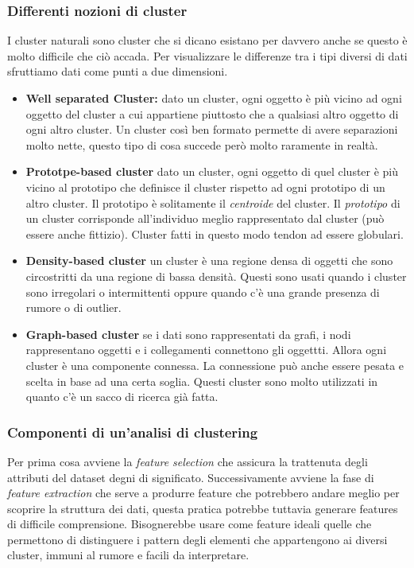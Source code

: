 \subsubsection{Differenti nozioni di cluster}
I cluster naturali sono cluster che si dicano esistano per davvero anche se questo  è molto difficile che ciò accada. Per visualizzare le differenze tra i tipi diversi di dati sfruttiamo dati come punti a due dimensioni.
\begin{itemize}
	\item \textbf{Well separated Cluster:} dato un cluster, ogni oggetto è più vicino ad ogni oggetto del cluster a cui appartiene piuttosto che a qualsiasi altro oggetto di ogni altro cluster. Un cluster così ben formato permette di avere separazioni molto nette, questo tipo di cosa succede però molto raramente in realtà.
	\item \textbf{Prototpe-based cluster} dato un cluster, ogni oggetto di quel cluster è più vicino al prototipo che definisce il cluster rispetto ad ogni prototipo di un altro cluster. Il prototipo \`e solitamente il \textit{centroide} del cluster. Il \textit{prototipo} di un cluster corrisponde all'individuo meglio rappresentato dal cluster (può essere anche fittizio). Cluster fatti in questo modo tendon ad essere globulari.
	\item \textbf{Density-based cluster} un cluster è una regione densa di oggetti che sono circostritti da una regione di bassa densità. Questi sono usati quando i cluster sono irregolari o intermittenti oppure quando c'è una grande presenza di rumore o di outlier.
	\item \textbf{Graph-based cluster} se i dati sono rappresentati da grafi, i nodi rappresentano  oggetti e i collegamenti connettono gli oggettti. Allora ogni cluster è una componente connessa. La connessione può anche essere pesata e scelta in base ad una certa soglia. 
	Questi cluster sono molto utilizzati in quanto c'è un sacco di ricerca già fatta.
\end{itemize}

\subsubsection{Componenti di un'analisi di clustering}

Per prima cosa  avviene la \textit{feature selection} che assicura la trattenuta degli attributi del dataset degni di significato. Successivamente avviene la fase di  \textit{feature extraction} che serve a produrre feature che potrebbero andare meglio per scoprire la struttura dei dati, questa pratica potrebbe tuttavia generare features di difficile comprensione.
Bisognerebbe usare come feature ideali quelle che permettono di distinguere i pattern degli elementi che appartengono ai diversi cluster, immuni al rumore e facili da interpretare.

